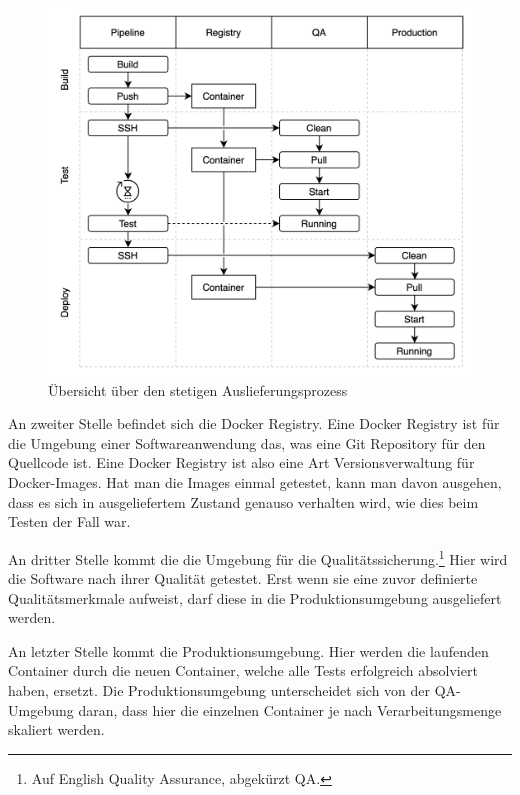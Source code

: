 \begin{figure}
    \begin{center}
    \includegraphics[scale=0.2]{img/abbildungen/Pipeline}
    \end{center}
    \caption{Übersicht über den stetigen Auslieferungsprozess}
    \label{figure:uebersichtueberdenstetigenauslieferungsprozess}
\end{figure}

An zweiter Stelle
befindet sich die Docker Registry. Eine Docker Registry ist für die Umgebung
einer Softwareanwendung das, was eine Git Repository für den Quellcode ist.
Eine Docker Registry ist also eine Art Versionsverwaltung für Docker-Images.
Hat man die Images einmal getestet, kann man davon ausgehen, dass es sich
in ausgeliefertem Zustand genauso verhalten wird, wie dies beim Testen der Fall war.

An dritter Stelle kommt die die Umgebung für die Qualitätssicherung.\footnote{Auf English Quality Assurance, abgekürzt QA.}
Hier wird die Software nach ihrer Qualität getestet. Erst wenn sie eine
zuvor definierte Qualitätsmerkmale aufweist, darf diese in die Produktionsumgebung
ausgeliefert werden.

An letzter Stelle kommt die Produktionsumgebung. Hier werden die laufenden Container durch
die neuen Container, welche alle Tests erfolgreich absolviert haben, ersetzt. Die Produktionsumgebung
unterscheidet sich von der QA-Umgebung daran, dass hier die einzelnen Container je nach Verarbeitungsmenge
skaliert werden.

